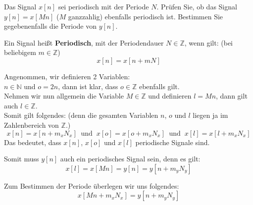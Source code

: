 \begin{uebsp}
\begin{Exercise}
Das Signal $x[n]$ sei periodisch mit der Periode $N$. Prüfen Sie, ob das Signal $y[n] = x[M n]$
($M$ ganzzahlig) ebenfalls periodisch ist. Bestimmen Sie gegebenenfalls die Periode von $y[n]$.
\end{Exercise}
\begin{Answer}
    \begin{uebsp_theory}
    Ein Signal heißt \textbf{Periodisch}, mit der Periodendauer $N\in\mathbb{Z}$, wenn gilt: (bei beliebigem $m\in \mathbb{Z}$)
    \[x[n]=x[n+mN]\]
    \end{uebsp_theory}

    Angenommen, wir definieren 2 Variablen:\\
    $n\in\mathbb{N}$ und $o=2n$, dann ist klar, dass $o\in\mathbb{Z}$ ebenfalls gilt.\\
    
    Nehmen wir nun allgemein die Variable $M\in\mathbb{Z}$ und definieren $l=Mn$, dann gilt auch $l\in\mathbb{Z}$.\\

    Somit gilt folgendes: (denn die gesamten Variablen $n$, $o$ und $l$ liegen ja im Zahlenbereich von $\mathbb{Z}$.)
    \[x[n]=x[n+m_xN_x]\;\;\text{und}\;\;x[o]=x[o+m_xN_x]\;\;\text{und}\;\;x[l]=x[l+m_xN_x]\]
    Das bedeutet, dass $x[n]$, $x[o]$ und $x[l]$ periodische Signale sind.
    
    Somit muss $y[n]$ auch ein periodisches Signal sein, denn es gilt:
    \[x[l]=x[Mn]=y[n]=y[n+m_yN_y]\]

    Zum Bestimmen der Periode überlegen wir uns folgendes:
    \[x[Mn+m_xN_x]=y[n+m_yN_y]\]

\end{Answer}
\end{uebsp}
